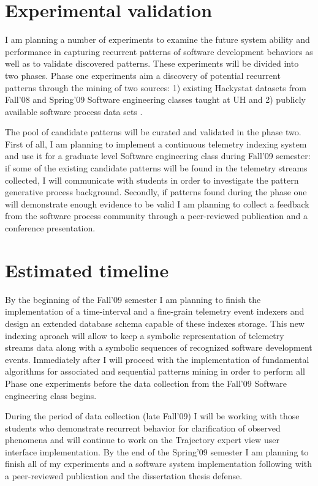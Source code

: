 \documentclass[11pt,oneside]{article}
\begin{document}
\section{Experimental validation}
I am planning a number of experiments to examine the future system ability and performance in capturing recurrent patterns of software development behaviors as well as to validate discovered patterns. These experiments will be divided into two phases. Phase one experiments aim a discovery of potential recurrent patterns through the mining of two sources: 1) existing Hackystat datasets from Fall'08 and Spring'09 Software engineering classes taught at UH and 2) publicly available software process data sets \cite{Sayyad-Shirabad+Menzies:2005}. 
	
The pool of candidate patterns will be curated and validated in the phase two. First of all, I am planning to implement a continuous telemetry indexing system and use it for a graduate level Software engineering class during Fall'09 semester: if some of the existing candidate patterns will be found in the telemetry streams collected, I will communicate with students in order to investigate the pattern generative process background. Secondly, if patterns found during the phase one will demonstrate enough evidence to be valid I am planning to collect a feedback from the software process community through a peer-reviewed publication and a conference presentation.

\section{Estimated timeline}
By the beginning of the Fall'09 semester I am planning to finish the implementation of a time-interval and a fine-grain telemetry event indexers and design an extended database schema capable of these indexes storage. This new indexing aproach will allow to keep a symbolic representation of telemetry streams data along with a symbolic sequences of recognized software development events. Immediately after I will proceed with the implementation of fundamental algorithms for associated and sequential patterns mining in order to perform all Phase one experiments before the data collection from the Fall'09 Software engineering class begins.

During the period of data collection (late Fall'09) I will be working with those students who demonstrate recurrent behavior for clarification of observed phenomena and will continue to work on the Trajectory expert view user interface implementation. By the end of the Spring'09 semester I am planning to finish all of my experiments and a software system implementation following with a peer-reviewed publication and the dissertation thesis defense.



\end{document}
